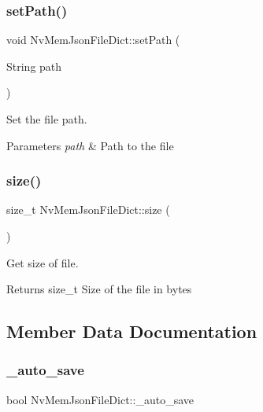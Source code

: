 \subsubsection{\texorpdfstring{setPath()}{setPath()}}
{\footnotesize\ttfamily void Nv\+Mem\+Json\+File\+Dict\+::set\+Path (\begin{DoxyParamCaption}\item[{String}]{path }\end{DoxyParamCaption})}



Set the file path. 


\begin{DoxyParams}{Parameters}
{\em path} & Path to the file \\
\hline
\end{DoxyParams}
\mbox{\label{class_nv_mem_json_file_dict_ae00ca1a78ae7e0d71fc8f36bc97bb32d}} 
\subsubsection{\texorpdfstring{size()}{size()}}
{\footnotesize\ttfamily size\+\_\+t Nv\+Mem\+Json\+File\+Dict\+::size (\begin{DoxyParamCaption}{ }\end{DoxyParamCaption})}



Get size of file. 

\begin{DoxyReturn}{Returns}
size\+\_\+t Size of the file in bytes 
\end{DoxyReturn}


\subsection{Member Data Documentation}
\mbox{\label{class_nv_mem_json_file_dict_afb9a35494c87bf2c2f7eecf3de0b8fb9}} 
\subsubsection{\texorpdfstring{\_auto\_save}{\_auto\_save}}
{\footnotesize\ttfamily bool Nv\+Mem\+Json\+File\+Dict\+::\+\_\+auto\+\_\+save\hspace{0.3cm}{\ttfamily [protected]}}

